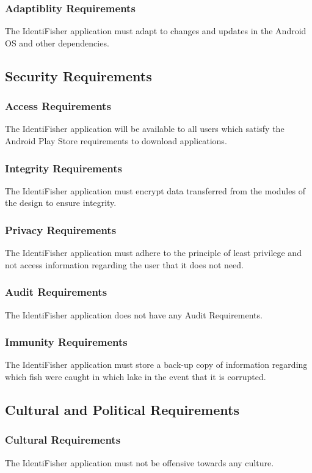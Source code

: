 \documentclass{article}
\begin{document}
\subsubsection{Adaptiblity Requirements}
The IdentiFisher application must adapt to changes and updates in the Android OS and other dependencies.

\subsection{Security Requirements}
\subsubsection{Access Requirements}
The IdentiFisher application will be available to all users which satisfy the Android Play Store requirements to download applications.
\subsubsection{Integrity Requirements}
The IdentiFisher application must encrypt data transferred from the modules of the design to ensure integrity.
\subsubsection{Privacy Requirements}
The IdentiFisher application must adhere to the principle of least privilege and not access information regarding the user that it does not need.
\subsubsection{Audit Requirements}
The IdentiFisher application does not have any Audit Requirements.
\subsubsection{Immunity Requirements}
The IdentiFisher application must store a back-up copy of information regarding which fish were caught in which lake in the event that it is corrupted.

\subsection{Cultural and Political Requirements}
\subsubsection{Cultural Requirements}
The IdentiFisher application must not be offensive towards any culture.
\end{document}
